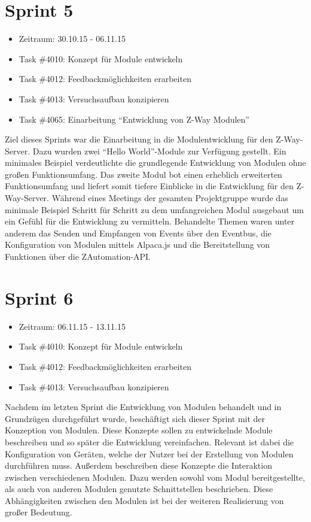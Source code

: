 \documentclass[12pt, oneside, smallheadings]{scrbook}
\begin{document}
\section{Sprint 5}
\begin{itemize}
	\item Zeitraum: 30.10.15 - 06.11.15 \newline
	\item Task \#4010: Konzept für Module entwickeln
	\item Task \#4012: Feedbackmöglichkeiten erarbeiten
	\item Task \#4013: Versuchsaufbau konzipieren
	\item Task \#4065: Einarbeitung "`Entwicklung von Z-Way Modulen"'\\
\end{itemize}
\noindent
Ziel dieses Sprints war die Einarbeitung in die Modulentwicklung für den Z-Way-Server. Dazu wurden zwei "`Hello World"'-Module zur Verfügung gestellt. Ein minimales Beispiel verdeutlichte die grundlegende Entwicklung von Modulen ohne großen Funktionsumfang. Das zweite Modul bot einen erheblich erweiterten Funktionsumfang und liefert somit tiefere Einblicke in die Entwicklung für den Z-Way-Server. Während eines Meetings der gesamten Projektgruppe wurde das minimale Beispiel Schritt für Schritt zu dem umfangreichen Modul ausgebaut um ein Gefühl für die Entwicklung zu vermitteln. Behandelte Themen waren unter anderem das Senden und Empfangen von Events über den Eventbus, die Konfiguration von Modulen mittels Alpaca.js und die Bereitstellung von Funktionen über die ZAutomation-API.

\section{Sprint 6}
\begin{itemize}
	\item Zeitraum: 06.11.15 - 13.11.15 \newline
	\item Task \#4010: Konzept für Module entwickeln	
	\item Task \#4012: Feedbackmöglichkeiten erarbeiten
	\item Task \#4013: Versuchsaufbau konzipieren\\
\end{itemize}
\noindent
Nachdem im letzten Sprint die Entwicklung von Modulen behandelt und in Grundzügen durchgeführt wurde, beschäftigt sich dieser Sprint mit der Konzeption von Modulen. Diese Konzepte sollen zu entwickelnde Module beschreiben und so später die Entwicklung vereinfachen. Relevant ist dabei die Konfiguration von Geräten, welche der Nutzer bei der Erstellung von Modulen durchführen muss. Außerdem beschreiben diese Konzepte die Interaktion zwischen verschiedenen Modulen. Dazu werden sowohl vom Modul bereitgestellte, als auch von anderen Modulen genutzte Schnittstellen beschrieben. Diese Abhängigkeiten zwischen den Modulen ist bei der weiteren Realisierung von großer Bedeutung.
\end{document}
